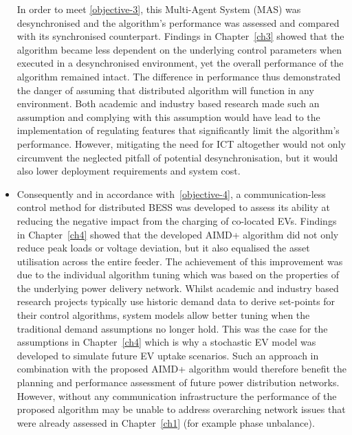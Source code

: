 \begin{itemize}
	In order to meet \ref{objective-3}, this Multi-Agent System (MAS) was desynchronised and the algorithm's performance was assessed and compared with its synchronised counterpart.
	Findings in Chapter~\ref{ch3} showed that the algorithm became less dependent on the underlying control parameters when executed in a desynchronised environment, yet the overall performance of the algorithm remained intact.
	The difference in performance thus demonstrated the danger of assuming that distributed algorithm will function in any environment.
	Both academic and industry based research made such an assumption and complying with this assumption would have lead to the implementation of regulating features that significantly limit the algorithm's performance.
	However, mitigating the need for ICT altogether would not only circumvent the neglected pitfall of  potential desynchronisation, but it would also lower deployment requirements and system cost.
	\item
	Consequently and in accordance with \ref{objective-4}, a communication-less control method for distributed BESS was developed to assess its ability at reducing the negative impact from the charging of co-located EVs.
	Findings in Chapter~\ref{ch4} showed that the developed AIMD+ algorithm did not only reduce peak loads or voltage deviation, but it also equalised the asset utilisation across the entire feeder.
	The achievement of this improvement was due to the individual algorithm tuning which was based on the properties of the underlying power delivery network.
	Whilst academic and industry based research projects typically use historic demand data to derive set-points for their control algorithms, system models allow better tuning when the traditional demand assumptions no longer hold.
	This was the case for the assumptions in Chapter~\ref{ch4} which is why a stochastic EV model was developed to simulate future EV uptake scenarios.
	Such an approach in combination with the proposed AIMD+ algorithm would therefore benefit the planning and performance assessment of future power distribution networks.
	However, without any communication infrastructure the performance of the proposed algorithm may be unable to address overarching network issues that were already assessed in Chapter~\ref{ch1} (for example phase unbalance).
\end{itemize}







